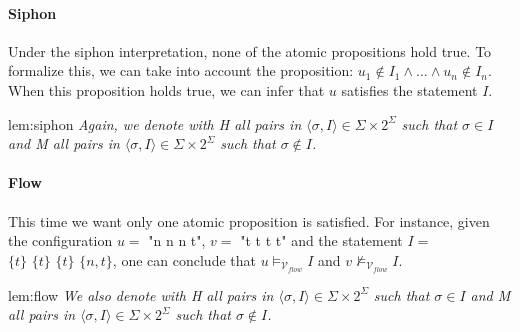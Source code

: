 \paragraph*{Siphon}
Under the siphon interpretation, none of the atomic propositions hold true.
To formalize this, we can take into account the proposition: $u_1 \notin I_1 \wedge \dots \wedge u_n \notin I_n$.
When this proposition holds true, we can infer that $u$ satisfies the statement $I$.

\begin{lem}{lem:siphon}
    \textit{Again, we denote with H all pairs in $\langle \sigma, I \rangle \in \Sigma \times 2^{\Sigma}$
    such that  $\sigma \in I$ and M all pairs in $\langle \sigma, I \rangle \in \Sigma \times 2^{\Sigma}$
    such that  $\sigma \notin I$.}

\end{lem}

\paragraph*{Flow}
This time we want only one atomic proposition is satisfied.
For instance, given the configuration $u = $ "n n n t", $v = $ "t t t t" and the statement $I =$ $\{t\} \,\, \{t\} \,\, \{t\} \,\, \{n, t\}$,
one can conclude that $u \models_{\mathcal{V}_{flow}} I$ and $v \not\models_{\mathcal{V}_{flow}} I$.
\newpage
\begin{lem}{lem:flow}
    \textit{We also denote with H all pairs in $\langle \sigma, I \rangle \in \Sigma \times 2^{\Sigma}$
    such that  $\sigma \in I$ and M all pairs in $\langle \sigma, I \rangle \in \Sigma \times 2^{\Sigma}$
    such that  $\sigma \notin I$.}

\end{lem}


